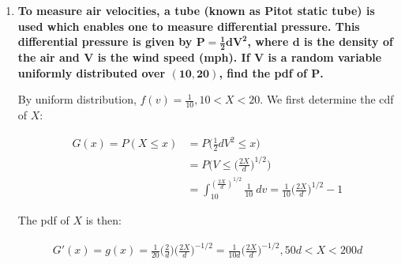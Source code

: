 \documentclass[10pt, oneside]{article}
\begin{document}
\begin{enumerate}[label=5.\arabic*]
Let $E$ be the random variable for radiant energy and $e$ a specific outcome of $E$. First we derive the cdf of $E$:

\begin{align*}
G(e) = P(E \leq e) &= P(0.173 (t / 100)^4 \leq e) \\
&= P \Big( t \leq 100 \Big( \frac{e}{0.173} \Big)^{1/4} \Big) \\
&= 200 \int^{100 (\frac{e}{0.173})^{1/4}}_{40} t^{-2} \ dt = - 2 \Big( \frac{e}{0.173} \Big)^{-3/4} + 5
\end{align*}

Then the pdf of $E$ is:

\begin{align*}
G'(e) = g(e) &= \frac{1}{2} \Big( \frac{e}{0.173} \Big)^{-3/4} \Big( \frac{1}{0.173} \Big) \\
&= 2.89 \Big( \frac{e}{0.173} \Big)^{-5/4} = \boxed{0.322 e^{-5/4}, 0.0044 \leq E \leq 0.0108}
\end{align*}

\item  \begin{tcolorbox}[
  colback=Cerulean!5!white,
  colframe=Cerulean!75!black]
\textbf{To measure air velocities, a tube (known as Pitot static tube) is used which enables one to measure differential pressure. This differential pressure is given by $\bm{P = \frac{1}{2} dV^2}$, where $\bm{d}$ is the density of the air and $\bm{V}$ is the wind speed (mph). If $\bm{V}$ is a random variable uniformly distributed over $\bm{(10,20)}$, find the pdf of $\bm{P}$.}
\end{tcolorbox}

By uniform distribution, $f(v) = \frac{1}{10}, 10 < X < 20$. We first determine the cdf of $X$:

\begin{align*}
G(x) = P(X \leq x) &= P \Big( \frac{1}{2} dV^2 \leq x \Big) \\
&= P \Big( V \leq \Big( \frac{2X}{d} \Big)^{1/2} \Big) \\
&= \int^{(\frac{2X}{d})^{1/2}}_{10} \frac{1}{10} \ dv = \frac{1}{10} \Big( \frac{2X}{d} \Big)^{1/2} - 1
\end{align*}

The pdf of $X$ is then:

\begin{align*}
G'(x) = g(x) = \frac{1}{20} \Big( \frac{2}{d} \Big) \Big( \frac{2X}{d} \Big)^{-1/2} = \boxed{ \frac{1}{10d} \Big( \frac{2X}{d} \Big)^{-1/2}, 50d < X < 200d }
\end{align*}


\end{enumerate}
\end{document}
